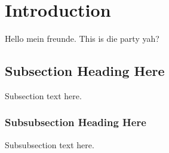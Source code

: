 \section{Introduction}

Hello mein freunde. This is die party yah?

\subsection{Subsection Heading Here}
Subsection text here.

\subsubsection{Subsubsection Heading Here}
Subsubsection text here.

\cite{efm32gg}
